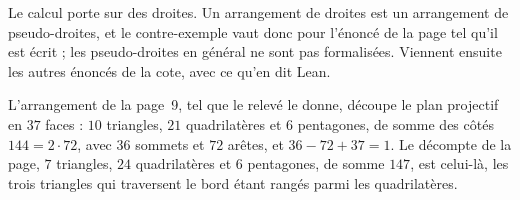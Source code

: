 Le calcul porte sur des droites. Un arrangement de droites est un arrangement de pseudo-droites, et le contre-exemple vaut donc pour l'énoncé de la page tel qu'il est écrit ; les pseudo-droites en général ne sont pas formalisées. Viennent ensuite les autres énoncés de la cote, avec ce qu'en dit Lean.

\begin{encadre}
\begin{theoreme*}
L'arrangement de la page~9, tel que le relevé le donne, découpe le plan projectif en $37$ faces : $10$ triangles, $21$ quadrilatères et $6$ pentagones, de somme des côtés $144 = 2 \cdot 72$, avec $36$ sommets et $72$ arêtes, et $36 - 72 + 37 = 1$. Le décompte de la page, $7$ triangles, $24$ quadrilatères et $6$ pentagones, de somme $147$, est celui-là, les trois triangles qui traversent le bord étant rangés parmi les quadrilatères.
\end{theoreme*}
\end{encadre}
